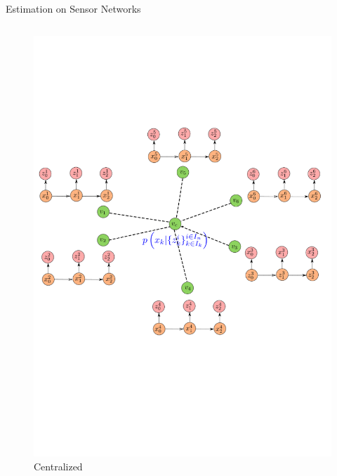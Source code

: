 \documentclass{beamer}
\theoremstyle{remark}
\begin{document}
\begin{frame}{Estimation on Sensor Networks}
\begin{columns}
	\begin{column}{.48\textwidth}
		\begin{figure}
			\centering
			\includegraphics[trim={0cm 8cm 0 8cm},clip,width=0.8\linewidth]{drawing2.png}
			\vspace{-0.7cm}
			\caption*{Centralized}
		\end{figure}
	\end{column}
\end{columns}
\end{frame}
\end{document}
